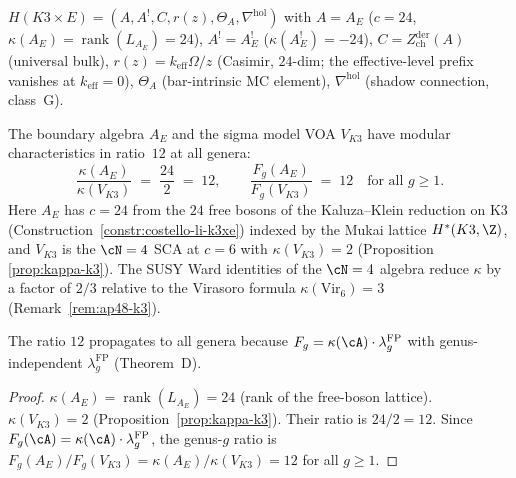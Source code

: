 \begin{remark}
\label{rem:holo-koszul-k3xe}
$H(K3 \times E) = (A, A^!, C, r(z), \Theta_A,
\nabla^{\mathrm{hol}})$ with
$A = A_E$ ($c = 24$, $\kappa(A_E) = \operatorname{rank}(L_{A_E}) = 24$),
$A^! = A_E^!$ ($\kappa(A_E^!) = -24$),
$C = Z^{\mathrm{der}}_{\mathrm{ch}}(A)$ (universal bulk),
$r(z) = k_{\mathrm{eff}}\Omega/z$ (Casimir, $24$-dim; the
effective-level prefix vanishes at $k_{\mathrm{eff}}=0$),
$\Theta_A$ (bar-intrinsic MC element),
$\nabla^{\mathrm{hol}}$ (shadow connection, class~G).
\end{remark}

\begin{proposition}
\label{prop:boundary-sigma-ratio}
The boundary algebra $A_E$ and the sigma model VOA
$V_{K3}$ have modular characteristics in ratio~$12$ at
all genera:
\begin{equation}\label{eq:boundary-sigma-ratio}
\frac{\kappa(A_E)}{\kappa(V_{K3})}
\;=\; \frac{24}{2} \;=\; 12,
\qquad
\frac{F_g(A_E)}{F_g(V_{K3})}
\;=\; 12
\quad\text{for all } g \geq 1.
\end{equation}
Here $A_E$ has $c = 24$ from the $24$ free bosons of the
Kaluza--Klein reduction on K3
\textup{(}Construction~\textup{\ref{constr:costello-li-k3xe})}
indexed by the Mukai lattice $H^*(K3, \Z)$, and
$V_{K3}$ is the $\cN = 4$ SCA at $c = 6$ with
$\kappa(V_{K3}) = 2$ \textup{(}Proposition~\textup{%
\ref{prop:kappa-k3})}. The SUSY Ward identities of the
$\cN = 4$ algebra reduce $\kappa$ by a factor of $2/3$
relative to the Virasoro formula $\kappa(\mathrm{Vir}_6) = 3$
\textup{(}Remark~\textup{\ref{rem:ap48-k3}}\textup{)}.

The ratio $12$ propagates to all genera because
$F_g = \kappa(\cA) \cdot \lambda_g^{\mathrm{FP}}$ with
genus-independent $\lambda_g^{\mathrm{FP}}$
\textup{(}Theorem~D\textup{)}.
\end{proposition}

\begin{proof}
$\kappa(A_E) = \operatorname{rank}(L_{A_E}) = 24$
(rank of the free-boson lattice).
$\kappa(V_{K3}) = 2$ (Proposition~\ref{prop:kappa-k3}).
Their ratio is $24/2 = 12$. Since
$F_g(\cA) = \kappa(\cA) \cdot \lambda_g^{\mathrm{FP}}$,
the genus-$g$ ratio is
$F_g(A_E)/F_g(V_{K3}) = \kappa(A_E)/\kappa(V_{K3}) = 12$
for all $g \geq 1$.
\end{proof}


